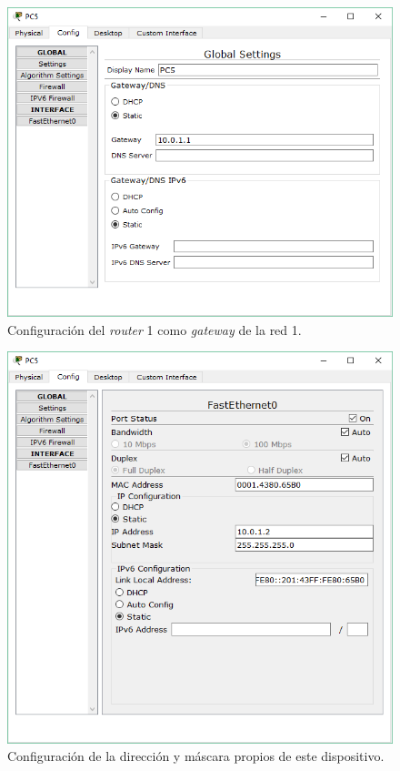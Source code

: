 \documentclass[spanish]{udpreport}
\begin{document}
\begin{figure}[H]
	\begin{center}
		\includegraphics[width= 12cm]{Imagenes/gateway_PC5}
		\caption{Configuración del \textit{router} 1 como \textit{gateway} de la red 1.}
	\end{center}
\end{figure}

\begin{figure}[H]
	\begin{center}
		\includegraphics[width= 12cm]{Imagenes/IP_PC5}
		\caption{Configuración de la dirección y máscara propios de este dispositivo.}
	\end{center}
\end{figure}
\end{document}
